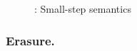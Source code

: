 \documentclass {llncs}
\begin{document}
%

\begin{figure}[!ht]
    \begin{scenter}
    
    \end{scenter}
    \caption{\svlrp: Small-step semantics}
    \label{fig:svlrp-dyn-sem}
\end{figure}
\clearpage
%    


\subsubsection{Erasure.} \label{sec:svlrp-erasure}
\end{document}
